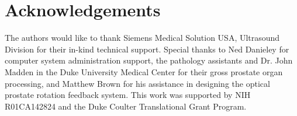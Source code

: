 \section*{Acknowledgements} 
The authors would like to thank Siemens Medical Solution USA, Ultrasound
Division for their in-kind technical support.  Special thanks to Ned Danieley
for computer system administration support, the pathology assistants and Dr.
John Madden in the Duke University Medical Center for their gross prostate
organ processing, and Matthew Brown for his assistance in designing the optical
prostate rotation feedback system.  This work was supported by NIH R01CA142824
and the Duke Coulter Translational Grant Program.
